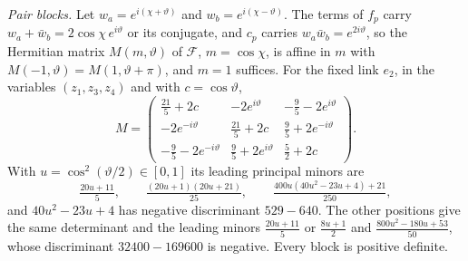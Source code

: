 \emph{Pair blocks.} Let $w_a=e^{i(\chi+\vartheta)}$ and $w_b=e^{i(\chi-\vartheta)}$. The
terms of $f_p$ carry $w_a+\bar w_b=2\cos\chi\,e^{i\vartheta}$ or its conjugate, and
$c_p$ carries $w_a\bar w_b=e^{2i\vartheta}$, so the Hermitian matrix $M(m,\vartheta)$ of
$\mathcal F$, $m=\cos\chi$, is affine in $m$ with $M(-1,\vartheta)=M(1,\vartheta+\pi)$,
and $m=1$ suffices. For the fixed link $e_2$, in the variables $(z_1,z_3,z_4)$
and with $c=\cos\vartheta$,
\[
M=\begin{pmatrix}\frac{21}5+2c&-2e^{i\vartheta}&-\frac95-2e^{i\vartheta}\\[2pt]
-2e^{-i\vartheta}&\frac{21}5+2c&\frac95+2e^{-i\vartheta}\\[2pt]
-\frac95-2e^{-i\vartheta}&\frac95+2e^{i\vartheta}&\frac52+2c\end{pmatrix}.
\]
With $u=\cos^2(\vartheta/2)\in[0,1]$ its leading principal minors are
\[
\tfrac{20u+11}5,\qquad\tfrac{(20u+1)(20u+21)}{25},\qquad
\tfrac{400u(40u^2-23u+4)+21}{250},
\]
and $40u^2-23u+4$ has negative discriminant $529-640$. The other positions give
the same determinant and the leading minors $\frac{20u+11}5$ or $\frac{8u+1}2$
and $\frac{800u^2-180u+53}{50}$, whose discriminant $32400-169600$ is negative.
Every block is positive definite.
